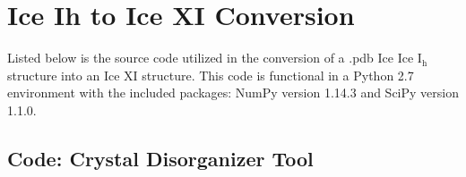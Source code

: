 \chapter{Ice Ih to Ice XI Conversion}
\label{ch:App:CrystalDisorg}

Listed below is the source code utilized in the conversion of a .pdb Ice Ice I$\mathrm{_{h}}$ structure into an Ice XI structure. This code is functional in a Python 2.7 environment with the included packages: NumPy version 1.14.3 and SciPy version 1.1.0.

\section{Code: Crystal Disorganizer Tool}


%
%
%
%
%
%

%
%
%
%


